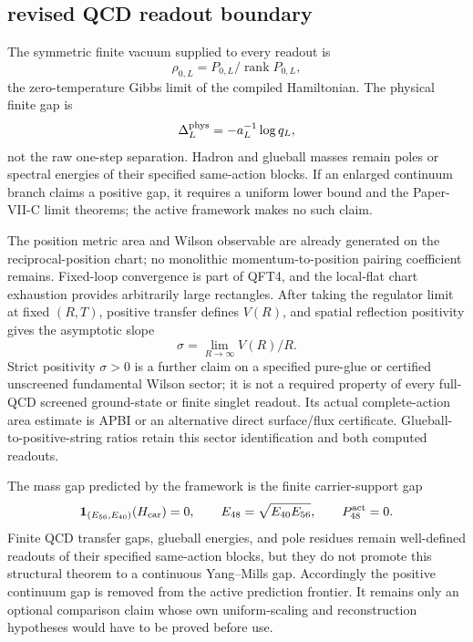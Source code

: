\documentclass[12pt,a4paper]{article}
\begin{document}
\subsection{revised QCD readout boundary}
\label{p11:sec:v164-revised-qcd-readout-boundary}

\begin{theorem}
\label{p11:thm:v164-vacuum-gap-readouts}
The symmetric finite vacuum supplied to every readout is
\[
 \rho_{0,L}=P_{0,L}/\operatorname{rank}P_{0,L},
\]
the zero-temperature Gibbs limit of the compiled Hamiltonian.  The physical
finite gap is
\[
 \Delta_L^{\rm phys}=-a_L^{-1}\log q_L,
\]
not the raw one-step separation.  Hadron and glueball masses remain poles or
spectral energies of their specified same-action blocks.  If an enlarged
continuum branch claims a positive gap, it requires a uniform lower bound and
the Paper-VII-C limit theorems; the active framework makes no such claim.
\end{theorem}

\begin{theorem}
\label{p11:thm:v164-string-tension-readout}
The position metric area and Wilson observable are already generated on the
reciprocal-position chart; no monolithic momentum-to-position pairing
coefficient remains.  Fixed-loop convergence is part of QFT4, and the
local-flat chart exhaustion provides arbitrarily large rectangles.  After
taking the regulator limit at fixed \((R,T)\), positive transfer defines
\(V(R)\), and spatial reflection positivity gives the asymptotic slope
\[
 \sigma=\lim_{R\to\infty}V(R)/R.
\]
Strict positivity \(\sigma>0\) is a further claim on a specified pure-glue
or certified unscreened fundamental Wilson sector; it is not a required
property of every full-QCD screened ground-state or finite singlet readout.
Its actual complete-action area estimate is APBI or an alternative direct
surface/flux certificate.  Glueball-to-positive-string ratios retain this
sector identification and both computed readouts.
\end{theorem}

\begin{theorem}
\label{p11:thm:v165-native-carrier-gap-qcd-boundary}
The mass gap predicted by the framework is the finite carrier-support gap
\[
 \mathbf1_{(E_{56},E_{40})}(H_{\rm car})=0,
 \qquad E_{48}=\sqrt{E_{40}E_{56}},
 \qquad P_{48}^{\rm act}=0.
\]
Finite QCD transfer gaps, glueball energies, and pole residues remain
well-defined readouts of their specified same-action blocks, but they do not
promote this structural theorem to a continuous Yang--Mills gap.  Accordingly
the positive continuum gap is removed from the active prediction frontier.
It remains only an optional comparison claim whose own uniform-scaling and
reconstruction hypotheses would have to be proved before use.
\end{theorem}
\end{document}
